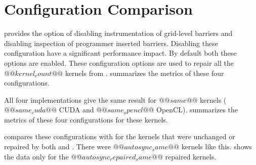 \section{Configuration Comparison}

\tool provides the option of disabling instrumentation of grid-level barriers and disabling inspection of programmer inserted barriers. Disabling these configuration have a significant performance impact. By default both these options are enabled. These configuration options are used to repair all the $@@kernel_count@@$ kernels from .  summarizes the metrics of these four configurations.



All four implementations give the same result for $@@same@@$ kernels ($@@same_cuda@@$ CUDA and $@@same_opencl@@$ OpenCL).  summarizes the metrics of these four configurations for these kernels.



 compares these configurations with \autosync for the kernels that were unchanged or repaired by both \tool and \autosync. There were $@@autosync_same@@$ kernels like this.  shows the data only for the $@@autosync_repaired_same@@$ repaired kernels.


